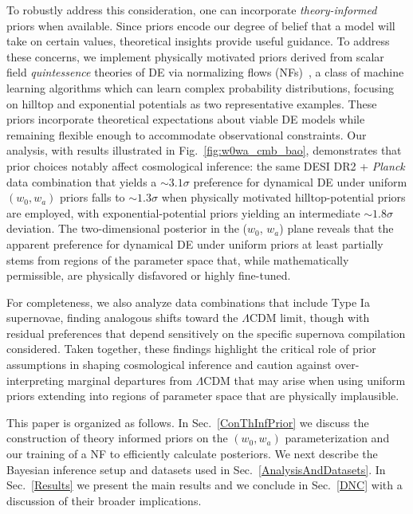 \documentclass[floats,floatfix,showpacs,amssymb,prd,twocolumn,superscriptaddress,nofootinbib,reprint,preprintnumbers]{revtex4-2}
\begin{document}
To robustly address this consideration, one can incorporate \textit{theory-informed} priors when available. Since priors encode our degree of belief that a model will take on certain values, theoretical insights provide useful guidance. To address these concerns, we implement physically motivated priors derived from scalar field {\it quintessence} theories of DE via normalizing flows (NFs)~\cite{2015arXiv150505770J, 2017arXiv170507057P},  a class of machine learning algorithms which can learn complex probability distributions, 
focusing on hilltop and exponential potentials as two representative examples.
These priors incorporate theoretical expectations about viable DE models while remaining flexible enough to accommodate observational constraints. Our analysis, with results illustrated in Fig.~\ref{fig:w0wa_cmb_bao}, demonstrates that prior choices 
notably affect cosmological inference: the same DESI DR2 + \textit{Planck} data combination that yields a $\sim 3.1\sigma$ preference for dynamical DE under uniform $(w_0,w_a)$ priors falls to $\sim 1.3\sigma$  when physically motivated hilltop-potential priors are employed, with exponential-potential priors yielding an intermediate $\sim 1.8\sigma$ deviation. The two-dimensional posterior in the ($w_0$, $w_a$) plane reveals that the apparent preference for dynamical DE under uniform priors 
at least partially stems from regions of the parameter space that, while mathematically permissible, are physically disfavored or highly fine-tuned. 



For completeness, we also analyze data combinations that include Type Ia supernovae, finding analogous shifts toward the $\Lambda$CDM limit, though with residual preferences that depend sensitively on the specific supernova compilation considered. Taken together, these findings highlight the critical role of prior assumptions in shaping cosmological inference and caution against over-interpreting marginal departures from $\Lambda$CDM that may arise when using uniform priors extending into regions of parameter space that are physically implausible.

This paper is organized as follows. In Sec.~\ref{ConThInfPrior} we discuss the construction of theory informed priors on the $(w_0,w_a)$ parameterization and our training of a NF to efficiently calculate posteriors. We next describe the Bayesian inference setup and datasets used in Sec.~\ref{AnalysisAndDatasets}. In Sec.~\ref{Results} we present the main results and we conclude in Sec.~\ref{DNC} with a discussion of their broader implications. 
\end{document}
